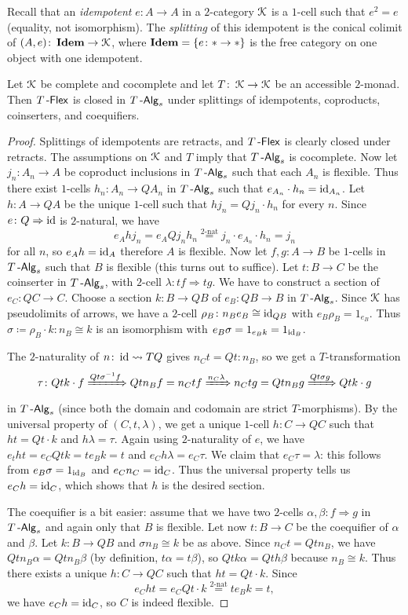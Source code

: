\documentclass[a4paper,11pt,oneside,openany]{scrbook}
\begin{document}
Recall that an \emph{idempotent} $e\colon A\to A$ in a $2$-category $\operatorname{\mathcal{K}}$ is a $1$-cell such that $e^2=e$ (equality, not isomorphism). The \emph{splitting} of this idempotent is the conical colimit of $(A,e)\colon \operatorname{\mathbf{Idem}}\to\operatorname{\mathcal{K}}$, where $\operatorname{\mathbf{Idem}}=\{e\colon*\to*\}$ is the free category on one object with one idempotent. 
\begin{thm}
    Let $\operatorname{\mathcal{K}}$ be complete and cocomplete and let $T\colon\operatorname{\mathcal{K}}\to\operatorname{\mathcal{K}}$ be an accessible $2$-monad. Then $T\operatorname{-\mathsf{Flex}}$ is closed in $T\operatorname{-\mathsf{Alg}}_s$ under splittings of idempotents, coproducts, coinserters, and coequifiers.
\end{thm}
\begin{proof}
 Splittings of idempotents are retracts, and $T\operatorname{-\mathsf{Flex}}$ is clearly closed under retracts. The assumptions on $\operatorname{\mathcal{K}}$ and $T$ imply that $T\operatorname{-\mathsf{Alg}}_s$ is cocomplete. Now let $j_n\colon A_n\to A$ be coproduct inclusions in $T\operatorname{-\mathsf{Alg}}_s$ such that each $A_n$ is flexible. Thus there exist $1$-cells $h_n\colon A_n\to QA_n$ in $T\operatorname{-\mathsf{Alg}}_s$ such that $e_{A_n}\cdot h_n=\operatorname{id}_{A_n}$. Let $h\colon A\to QA$ be the unique $1$-cell such that $hj_n=Qj_n\cdot h_n$ for every $n$. Since $e\colon Q\Rightarrow\operatorname{id}$ is $2$-natural, we have
 $$e_Ahj_n = e_AQj_nh_n\overset{2\mbox{-}\text{nat}}{=}j_n\cdot e_{A_n}\cdot h_n=j_n$$
 for all $n$, so $e_Ah=\operatorname{id}_A$ therefore $A$ is flexible.
 Now let $f,g\colon A\to B$ be $1$-cells in $T\operatorname{-\mathsf{Alg}}_s$ such that $B$ is flexible (this turns out to suffice). Let $t\colon B\to C$ be the coinserter in $T\operatorname{-\mathsf{Alg}}_s$, with $2$-cell $\lambda\colon tf\Rightarrow tg$. We have to construct a section of $e_C\colon QC\to C$. Choose a section $k\colon B\to QB$ of $e_B\colon QB\to B$ in $T\operatorname{-\mathsf{Alg}}_s$. Since $\operatorname{\mathcal{K}}$ has pseudolimits of arrows, we have a $2$-cell $\rho_B\colon n_Be_B\cong \operatorname{id}_{QB}$ with $e_B\rho_B=1_{e_B}$. Thus $\sigma\coloneqq\rho_B\cdot k\colon n_B\cong k$ is an isomorphism with $e_B\sigma = 1_{e_Bk}=1_{\operatorname{id}_B}$. 
 
 The $2$-naturality of $n\colon\operatorname{id}\rightsquigarrow TQ$ gives $n_C t=Qt\colon n_B$, so we get a $T$-transformation
 $$\tau\colon Qtk\cdot f\xRightarrow{Qt\sigma^{-1}f}Qtn_Bf=n_Ctf\xRightarrow{n_C\lambda}n_Ctg=Qtn_Bg\xRightarrow{Qt\sigma g}Qtk\cdot g$$ in $T\operatorname{-\mathsf{Alg}}_s$ (since both the domain and codomain are strict $T$-morphisms). By the universal property of $(C,t,\lambda)$, we get a unique $1$-cell $h\colon C\to QC$ such that $ht=Qt\cdot k$ and $h\lambda=\tau$. Again using $2$-naturality of $e$, we have $e_tht=e_CQtk=te_Bk=t$ and $e_Ch\lambda=e_C\tau$. We claim that $e_C\tau=\lambda$: this follows from $e_B\sigma=1_{\operatorname{id}_B}$ and $e_Cn_C=\operatorname{id}_C$. Thus the universal property tells us $e_Ch=\operatorname{id}_C$, which shows that $h$ is the desired section.
 
 The coequifier is a bit easier: assume that we have two $2$-cells $\alpha,\beta\colon f\Rightarrow g$ in $T\operatorname{-\mathsf{Alg}}_s$ and again only that $B$ is flexible. Let now $t\colon B\to C$ be the coequifier of $\alpha$ and $\beta$. Let $k\colon B\to QB$ and $\sigma n_B\cong k$ be as above. Since $n_Ct = Qt n_B$, we have $Qtn_B\alpha=Qtn_B\beta$ (by definition, $t\alpha=t\beta$), so $Qtk\alpha = Qth\beta$ because $n_B\cong k$. Thus there exists a unique $h\colon C\to QC$ such that $ht=Qt\cdot k$. Since 
 $$e_Cht=e_CQt\cdot k\overset{2\mbox{-}\text{nat}}{=} te_Bk = t,$$
 we have $e_Ch=\operatorname{id}_C$, so $C$ is indeed flexible.
\end{proof} 
\backmatter
\end{document}
